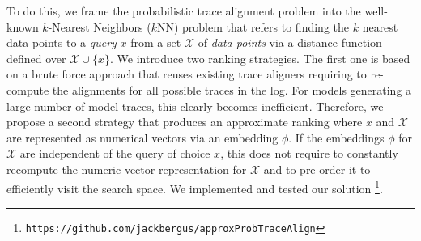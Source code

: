 To do this, we frame the probabilistic trace alignment problem into the well-known $k$-Nearest Neighbors ($k$NN) problem \cite{Altman} that refers to finding the $k$ nearest data points to a \textit{query} $x$ from a set $\mathcal{X}$ of \textit{data points} via a distance function defined over $\mathcal{X}\cup\{x\}$.
We introduce two ranking strategies. The first one is based on a brute force approach that reuses existing trace aligners  \cite{LeoniM17} %
requiring to re-compute the alignments for all possible traces in the log. For models generating a large number of model traces, this clearly becomes inefficient. Therefore, we propose a second strategy that produces an approximate ranking where $x$ and $\mathcal{X}$ are represented as numerical vectors via an embedding $\phi$.
If the embeddings $\phi$ for $\mathcal{X}$ are independent of the query of choice $x$, this does not require to constantly recompute the numeric vector representation for $\mathcal{X}$ and to pre-order it to efficiently visit the search space. We implemented and tested our solution
\footnote{{\small \texttt{\tiny https://github.com/jackbergus/approxProbTraceAlign}}}.

